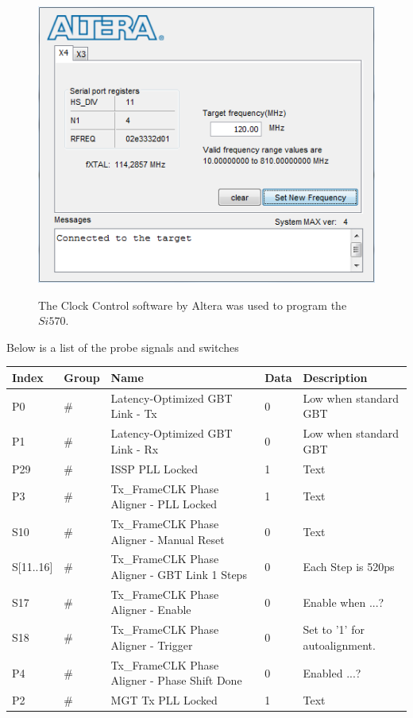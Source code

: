 \documentclass[main.tex]{subfiles}
\begin{document}
\begin{figure}[ht] %
\begin{center}
\includegraphics[scale=1]{../img/clk_cont120}  \\[0.1 cm]
\caption{The Clock Control software by Altera was used to program the $Si570$.}
\label{fig:clk_cont120}
\end{center}
\end{figure} 


Below is a list of the probe signals and switches 

\begin{center}
  \begin{tabulary}{1\textwidth}{|L|L|L|L|L|}
  \hline
    Index & Group & Name &  Data & Description   \\
    \hline
     P0   & \# & Latency-Optimized GBT Link - Tx                     & 0 & Low when standard GBT    \\
     \hline
     P1   & \# & Latency-Optimized GBT Link - Rx                    & 0 & Low when standard GBT      \\
     \hline
     P29 & \# & ISSP PLL Locked                                                       & 1 & Text \\
     \hline
     P3   & \# & Tx\_FrameCLK Phase Aligner - PLL Locked & 1 & Text \\     
     \hline
      S10   & \# & Tx\_FrameCLK Phase Aligner - Manual Reset & 0 & Text \\     
     \hline
      S[11..16]   & \# & Tx\_FrameCLK Phase Aligner - GBT Link 1 Steps & 0 & Each Step is 520ps \\     
     \hline
      S17   & \# & Tx\_FrameCLK Phase Aligner - Enable & 0 & Enable when ...? \\    
     \hline
      S18   & \# & Tx\_FrameCLK Phase Aligner - Trigger & 0 & Set to '1' for autoalignment. \\    
     \hline
      P4   & \# & Tx\_FrameCLK Phase Aligner - Phase Shift Done & 0 & Enabled ...? \\    
     \hline
      P2   & \# & MGT Tx PLL Locked & 1 & Text \\    
     \hline     
  \end{tabulary}  
\end{center}
\end{document}
